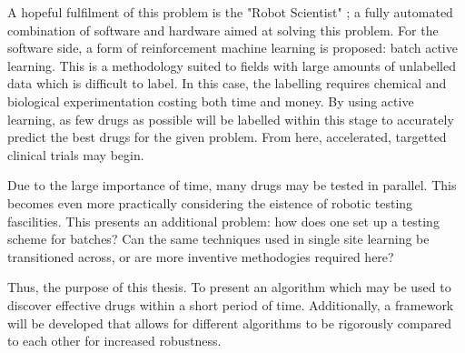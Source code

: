 A hopeful fulfilment of this problem is the "Robot Scientist" \cite{And10}; a fully automated combination of software and hardware aimed at solving this problem. For the software side, a form of reinforcement machine learning is proposed: batch active learning. This is a methodology suited to fields with large amounts of unlabelled data which is difficult to label. In this case, the labelling requires chemical and biological experimentation costing both time and money. By using active learning, as few drugs as possible will be labelled within this stage to accurately predict the best drugs for the given problem. From here, accelerated, targetted clinical trials may begin.

Due to the large importance of time, many drugs may be tested in parallel. This becomes even more practically considering the eistence of robotic testing fascilities. This presents an additional problem: how does one set up a testing scheme for batches? Can the same techniques used in single site learning be transitioned across, or are more inventive methodogies required here?

Thus, the purpose of this thesis. To present an algorithm which may be used to discover effective drugs within a short period of time. Additionally, a framework will be developed that allows for different algorithms to be rigorously compared to each other for increased robustness.